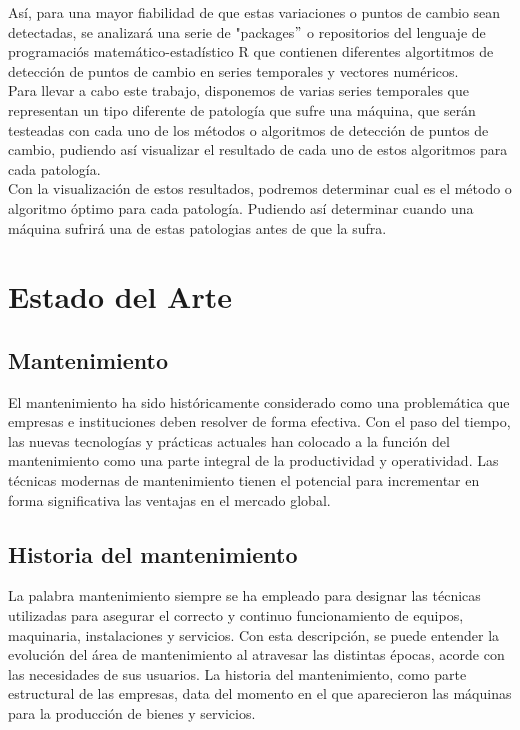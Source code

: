 \documentclass[runningheads,a4paper,12pt]{report}
\begin{document}
Así, para una mayor fiabilidad de que estas variaciones o puntos de cambio sean detectadas, se analizará una serie de "packages$"$ o repositorios del lenguaje de programaciós matemático-estadístico R que contienen diferentes algortitmos de detección de puntos de cambio en series temporales y vectores numéricos.\\

Para llevar a cabo este trabajo, disponemos de varias series temporales que representan un tipo diferente de patología que sufre una máquina, que serán testeadas con cada uno de los métodos o algoritmos de detección de puntos de cambio, pudiendo así visualizar el resultado de cada uno de estos algoritmos para cada patología.\\

Con la visualización de estos resultados, podremos determinar cual es el método o algoritmo óptimo para cada patología. Pudiendo así determinar cuando una máquina sufrirá una de estas patologias antes de que la sufra.\\

\newpage
\section{Estado del Arte}
\subsection{Mantenimiento}
El mantenimiento ha sido históricamente considerado como una problemática que empresas e instituciones deben resolver de forma efectiva. Con el paso del tiempo, las nuevas tecnologías y prácticas actuales han colocado a la función del mantenimiento como una parte integral de la productividad y operatividad. Las técnicas modernas de mantenimiento tienen el potencial para incrementar en forma significativa las ventajas en el mercado global. 

\subsection{Historia del mantenimiento}

La palabra mantenimiento siempre se ha empleado para designar las técnicas utilizadas para asegurar el correcto y continuo funcionamiento de equipos, maquinaria, instalaciones y servicios. Con esta descripción, se puede entender la evolución del área de mantenimiento al atravesar las distintas épocas, acorde con las necesidades de sus usuarios. La historia del mantenimiento, como parte estructural de las empresas, data del momento en el que aparecieron las máquinas para la producción de bienes y servicios. \\
\end{document}
